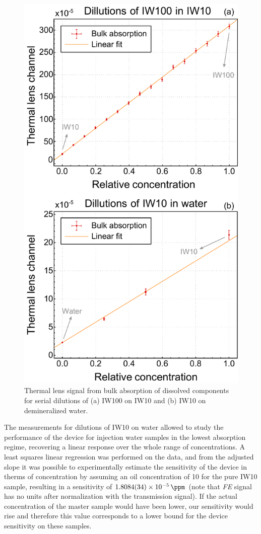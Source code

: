 \documentclass[9pt,twocolumn,twoside]{osajnl}
\newcommand{\FE}{\textit{FE}}
\begin{document}
\begin{figure}[t!]
	\centering \includegraphics[width=.49\textwidth]{figures/IWvsC.pdf}
	\caption{Thermal lens signal from bulk absorption of dissolved components for serial dilutions of (a) IW100 on IW10 and (b) IW10 on demineralized water.}
	\label{fig:BulkAbsorption}
\end{figure}

The measurements for dilutions of IW10 on water allowed to study the performance of the device for injection water samples in the lowest absorption regime, recovering a linear response over the whole range of concentrations. A least squares linear regression was performed on the data, and from the adjusted slope it was possible to experimentally estimate the sensitivity of the device in therms of concentration by assuming an oil concentration of \SI{10}{\ppm} for the pure IW10 sample, resulting in a sensitivity of $\SI{1.8084(34)d-5}{\per\ppm}$ (note that \FE{} signal has no units after normalization with the transmission signal). If the actual concentration of the master sample would have been lower, our sensitivity would rise and therefore this value corresponds to a lower bound for the device sensitivity on these samples.
\end{document}
